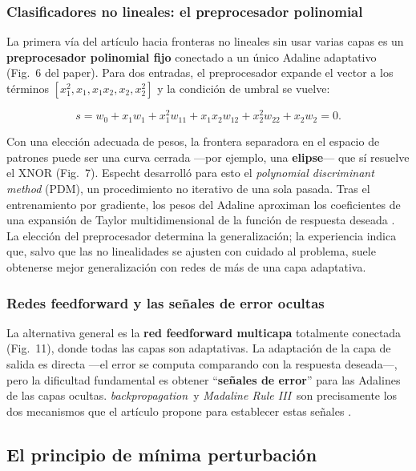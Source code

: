 \documentclass[11pt,a4paper]{article}
\newcommand{\bp}{\textit{backpropagation}}
\newcommand{\mriii}{\textit{Madaline Rule III}}
\begin{document}
\subsubsection{Clasificadores no lineales: el preprocesador polinomial}

La primera vía del artículo hacia fronteras no lineales sin usar varias capas es un
\textbf{preprocesador polinomial fijo} conectado a un único Adaline adaptativo (Fig.~6 del paper).
Para dos entradas, el preprocesador expande el vector a los términos $[x_1^2, x_1, x_1 x_2, x_2,
x_2^2]$ y la condición de umbral se vuelve:

\begin{equation}
s = w_0 + x_1 w_1 + x_1^2 w_{11} + x_1 x_2 w_{12} + x_2^2 w_{22} + x_2 w_2 = 0.
\label{eq:polinomial}
\end{equation}

Con una elección adecuada de pesos, la frontera separadora en el espacio de patrones puede ser una
curva cerrada —por ejemplo, una \textbf{elipse}— que sí resuelve el XNOR (Fig.~7). Especht
desarrolló para esto el \textit{polynomial discriminant method} (PDM), un procedimiento no
iterativo de una sola pasada. Tras el entrenamiento por gradiente, los pesos del Adaline aproximan
los coeficientes de una expansión de Taylor multidimensional de la función de respuesta deseada
\cite{widrow1990}. La elección del preprocesador determina la generalización; la experiencia indica
que, salvo que las no linealidades se ajusten con cuidado al problema, suele obtenerse mejor
generalización con redes de más de una capa adaptativa.

\subsubsection{Redes feedforward y las señales de error ocultas}

La alternativa general es la \textbf{red feedforward multicapa} totalmente conectada (Fig.~11),
donde todas las capas son adaptativas. La adaptación de la capa de salida es directa —el error se
computa comparando con la respuesta deseada—, pero la dificultad fundamental es obtener
``\textbf{señales de error}'' para las Adalines de las capas ocultas. \bp~y \mriii~son
precisamente los dos mecanismos que el artículo propone para establecer estas señales
\cite{widrow1990}.

\subsection{El principio de mínima perturbación}\label{ssec:mdp}
\end{document}
